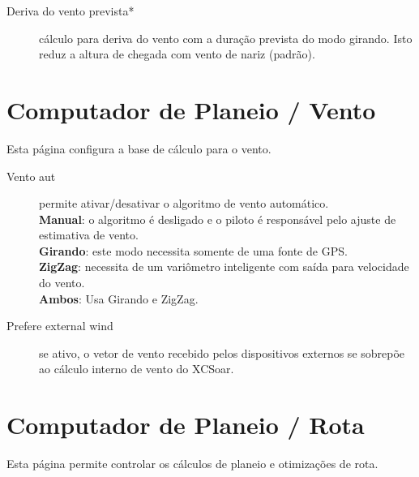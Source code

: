 \begin{description}
\item[Deriva do vento prevista*]  \label{conf:predict-drift}cálculo para deriva do vento com a duração prevista do modo girando.  Isto reduz a altura de chegada com vento de nariz (padrão).
\end{description}


\section{Computador de Planeio / Vento} \label{sec:wind}

Esta página configura a base de cálculo para o vento.

\begin{description}
\item[Vento aut]  \label{conf:autowind} permite ativar/desativar o algoritmo de vento automático. \\
  {\bf Manual}: o algoritmo é desligado e o piloto é responsável pelo ajuste de estimativa de vento. \\
  {\bf Girando}: este modo necessita somente de uma fonte de GPS. \\
  {\bf ZigZag}: necessita de um variômetro inteligente com saída para velocidade do vento. \\
  {\bf Ambos}:  Usa  Girando e ZigZag.
\item[Prefere external wind]  se ativo, o vetor de vento recebido pelos dispositivos externos se sobrepõe ao cálculo interno de vento do XCSoar.
\end{description}


\section{Computador de Planeio / Rota}

Esta página permite controlar os cálculos de planeio e otimizações de rota.

